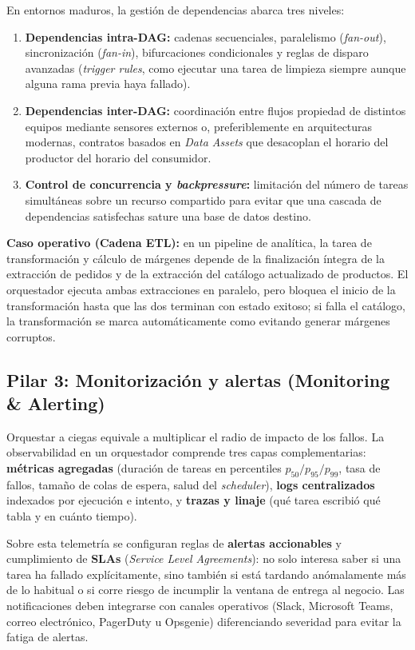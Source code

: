 En entornos maduros, la gestión de dependencias abarca tres niveles:
\begin{enumerate}
  \item \textbf{Dependencias intra-DAG:} cadenas secuenciales, paralelismo (\textit{fan-out}), sincronización (\textit{fan-in}), bifurcaciones condicionales y reglas de disparo avanzadas (\textit{trigger rules}, como ejecutar una tarea de limpieza siempre aunque alguna rama previa haya fallado).
  \item \textbf{Dependencias inter-DAG:} coordinación entre flujos propiedad de distintos equipos mediante sensores externos o, preferiblemente en arquitecturas modernas, contratos basados en \textit{Data Assets} que desacoplan el horario del productor del horario del consumidor.
  \item \textbf{Control de concurrencia y \textit{backpressure}:} limitación del número de tareas simultáneas sobre un recurso compartido para evitar que una cascada de dependencias satisfechas sature una base de datos destino.
\end{enumerate}

\textbf{Caso operativo (Cadena ETL):} en un pipeline de analítica, la tarea de transformación y cálculo de márgenes depende de la finalización íntegra de la extracción de pedidos y de la extracción del catálogo actualizado de productos. El orquestador ejecuta ambas extracciones en paralelo, pero bloquea el inicio de la transformación hasta que las dos terminan con estado exitoso; si falla el catálogo, la transformación se marca automáticamente como  evitando generar márgenes corruptos.

\subsection{Pilar 3: Monitorización y alertas (Monitoring \& Alerting)}\label{subsec:pilar-monitoring}

Orquestar a ciegas equivale a multiplicar el radio de impacto de los fallos. La observabilidad en un orquestador comprende tres capas complementarias: \textbf{métricas agregadas} (duración de tareas en percentiles $p_{50}/p_{95}/p_{99}$, tasa de fallos, tamaño de colas de espera, salud del \textit{scheduler}), \textbf{logs centralizados} indexados por ejecución e intento, y \textbf{trazas y linaje} (qué tarea escribió qué tabla y en cuánto tiempo).

Sobre esta telemetría se configuran reglas de \textbf{alertas accionables} y cumplimiento de \textbf{SLAs} (\textit{Service Level Agreements}): no solo interesa saber si una tarea ha fallado explícitamente, sino también si está tardando anómalamente más de lo habitual o si corre riesgo de incumplir la ventana de entrega al negocio. Las notificaciones deben integrarse con canales operativos (Slack, Microsoft Teams, correo electrónico, PagerDuty u Opsgenie) diferenciando severidad para evitar la fatiga de alertas.

